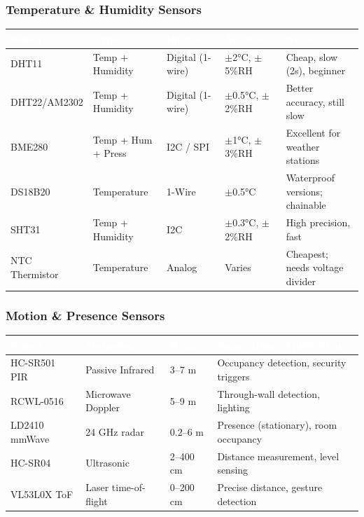 \documentclass[11pt,letterpaper]{article}
\newcommand{\tableheader}[1]{\textbf{\sffamily\textcolor{white}{#1}}}
\begin{document}
\subsubsection{Temperature \& Humidity Sensors}

\begin{center}
\begin{tabularx}{\textwidth}{L{2.5cm}L{2cm}L{2cm}L{2cm}X}
\toprule
{}
\tableheader{Sensor} & \tableheader{Type} & \tableheader{Interface} & \tableheader{Accuracy} & \tableheader{Notes} \\
\midrule
DHT11 & Temp + Humidity & Digital (1-wire) & $\pm$2°C, $\pm$5\%RH & Cheap, slow (2s), beginner \\
DHT22/AM2302 & Temp + Humidity & Digital (1-wire) & $\pm$0.5°C, $\pm$2\%RH & Better accuracy, still slow \\
BME280 & Temp + Hum + Press & I2C / SPI & $\pm$1°C, $\pm$3\%RH & Excellent for weather stations \\
DS18B20 & Temperature & 1-Wire & $\pm$0.5°C & Waterproof versions; chainable \\
SHT31 & Temp + Humidity & I2C & $\pm$0.3°C, $\pm$2\%RH & High precision, fast \\
NTC Thermistor & Temperature & Analog & Varies & Cheapest; needs voltage divider \\
\bottomrule
\end{tabularx}
\end{center}

\subsubsection{Motion \& Presence Sensors}

\begin{center}
\begin{tabularx}{\textwidth}{L{2.5cm}L{2cm}L{2cm}X}
\toprule
{}
\tableheader{Sensor} & \tableheader{Technology} & \tableheader{Range} & \tableheader{Smart Home Applications} \\
\midrule
HC-SR501 PIR & Passive Infrared & 3--7 m & Occupancy detection, security triggers \\
RCWL-0516 & Microwave Doppler & 5--9 m & Through-wall detection, lighting \\
LD2410 mmWave & 24 GHz radar & 0.2--6 m & Presence (stationary), room occupancy \\
HC-SR04 & Ultrasonic & 2--400 cm & Distance measurement, level sensing \\
VL53L0X ToF & Laser time-of-flight & 0--200 cm & Precise distance, gesture detection \\
\bottomrule
\end{tabularx}
\end{center}
\end{document}
